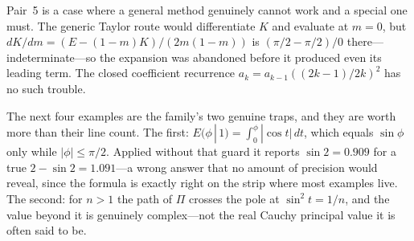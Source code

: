 \begin{codepairs}
\end{codepairs}

Pair~5 is a case where a general method genuinely cannot work and a special one must.
The generic Taylor route would differentiate \(K\) and evaluate at \(m=0\), but
\(dK/dm=(E-(1-m)K)/(2m(1-m))\) is \((\pi/2-\pi/2)/0\) there---indeterminate---so the
expansion was abandoned before it produced even its leading term. The closed
coefficient recurrence \(a_k=a_{k-1}((2k-1)/2k)^2\) has no such trouble.


The next four examples are the family's two genuine traps, and they are worth more
than their line count. The first: \(E(\phi\,|\,1)=\int_0^\phi|\cos t|\,dt\), which
equals \(\sin\phi\) only while \(|\phi|\le\pi/2\). Applied without that guard it
reports \(\sin 2=0.909\) for a true \(2-\sin 2=1.091\)---a wrong answer that no
amount of precision would reveal, since the formula is exactly right on the strip
where most examples live. The second: for \(n>1\) the path of \(\Pi\) crosses the
pole at \(\sin^2 t=1/n\), and the value beyond it is genuinely
complex---not the real Cauchy principal value it
is often said to be.

